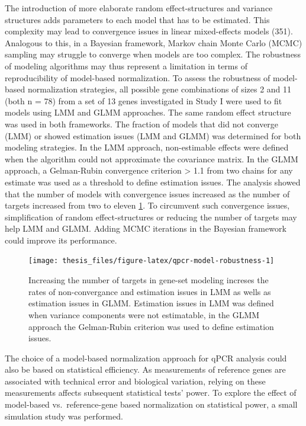 \documentclass[twoside,10pt]{gihclass} %
\begin{document}
The introduction of more elaborate random effect-structures and variance structures adds parameters to each model that has to be estimated. This complexity may lead to convergence issues in linear mixed-effects models
(351).
Analogous to this, in a Bayesian framework, Markov chain Monte Carlo (MCMC) sampling may struggle to converge when models are too complex.
The robustness of modeling algorithms may thus represent a limitation in terms of reproducibility of model-based normalization.
To assess the robustness of model-based normalization strategies, all possible gene combinations of sizes 2 and 11 (both n = 78) from a set of 13 genes investigated in Study I were used to fit models using LMM and GLMM approaches.
The same random effect structure was used in both frameworks.
The fraction of models that did not converge (LMM) or showed estimation issues (LMM and GLMM) was determined for both modeling strategies. In the LMM approach, non-estimable effects were defined when the algorithm could not approximate the covariance matrix. In the GLMM approach, a Gelman-Rubin convergence criterion \textgreater{} 1.1 from two chains for any estimate was used as a threshold to define estimation issues.
The analysis showed that the number of models with convergence issues increased as the number of targets increased from two to eleven \ref{fig:qpcr-model-robustness}. To circumvent such convergence issues, simplification of random effect-structures or reducing the number of targets may help LMM and GLMM. Adding MCMC iterations in the Bayesian framework could improve its performance.
\begin{figure}

{\centering \texttt{[image: thesis\_files/figure-latex/qpcr-model-robustness-1]} 

}

\caption[Robustness of model-based qPCR normalization]{Increasing the number of targets in gene-set modeling increses the rates of non-convergance and estimation issues in LMM as wells as estimation issues in GLMM. Estimation issues in LMM was defined when variance components were not estimatable, in the GLMM approach the Gelman-Rubin criterion was used to define estimation issues.}\label{fig:qpcr-model-robustness}
\end{figure}
The choice of a model-based normalization approach for qPCR analysis could also be based on statistical efficiency. As measurements of reference genes are associated with technical error and biological variation, relying on these measurements affects subsequent statistical tests' power. To explore the effect of model-based vs.~reference-gene based normalization on statistical power, a small simulation study was performed.
\end{document}
